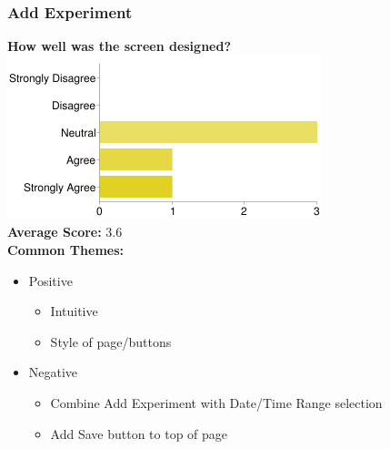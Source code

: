 \subsubsection{Add Experiment}
\textbf{How well was the screen designed?}\\
\includegraphics[page=1,scale=0.65]{../other/usability-report-charts/create_experiment_bar_chart}\\
\textbf{Average Score:} 3.6\\
\textbf{Common Themes:}
\begin{itemize}
\item Positive
\begin{itemize}
\item Intuitive
\item Style of page/buttons
\end{itemize}
\item Negative
\begin{itemize}
\item Combine Add Experiment with Date/Time Range selection
\item Add Save button to top of page
\end{itemize}
\end{itemize}

